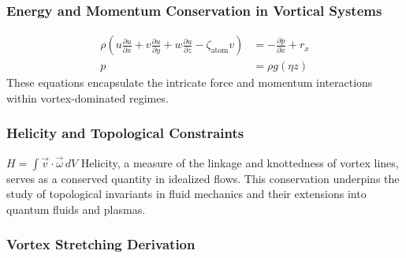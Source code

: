 \documentclass[12pt]{article}
\begin{document}
    \subsubsection*{Energy and Momentum Conservation in Vortical Systems}
    \begin{align}
        \rho \left( u \frac{\partial u}{\partial x} + v \frac{\partial u}{\partial y} + w \frac{\partial u}{\partial z} - \zeta_\text{atom} v \right) &= -\frac{\partial p}{\partial x} + r_x \\
        p &= \rho g(\eta z)
    \end{align}
    These equations encapsulate the intricate force and momentum interactions within vortex-dominated regimes.


\subsubsection*{Helicity and Topological Constraints}
$H = \int \vec{v} \cdot \vec{\omega} \, dV$
 Helicity, a measure of the linkage and knottedness of vortex lines, serves as a conserved quantity in idealized flows. This conservation underpins the study of topological invariants in fluid mechanics and their extensions into quantum fluids and plasmas.

 \subsubsection{Vortex Stretching Derivation}
\end{document}
